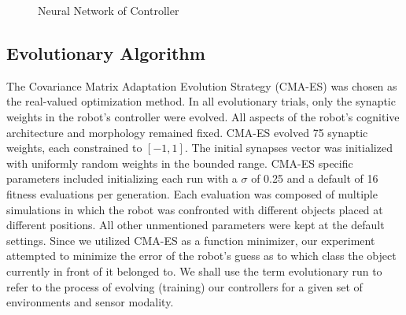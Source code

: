 \documentclass{sig-alternate}
\begin{document}
\begin{figure}
   \vspace{-0.3cm} 
   \caption{Neural Network of Controller}
   \vspace{-0.3cm} 
   \label{fig:neuralnet}    
\end{figure}
  
\subsection {Evolutionary Algorithm}

The Covariance Matrix Adaptation Evolution Strategy \cite{cmaes} (CMA-ES) was chosen as the real-valued optimization method. In all evolutionary trials,
only the synaptic weights in the robot's controller were evolved. All aspects of the robot's cognitive architecture and morphology remained fixed. CMA-ES evolved 75 synaptic weights, each constrained to $[-1, 1]$. The initial synapses vector was initialized with uniformly random weights in the bounded range. CMA-ES specific parameters included initializing each run with a $\sigma$ of 0.25 and a default of 16 fitness evaluations per generation. Each evaluation was composed of multiple simulations in which the robot was confronted with different objects placed at different positions. All other unmentioned parameters were kept at the default settings. Since we utilized CMA-ES as a function minimizer, our experiment attempted to minimize the error of the robot's guess as to which class the object currently in front of it belonged to. We shall use the term evolutionary run to refer to the process of evolving (training) our controllers for a given set of environments and sensor modality. 
\end{document}
